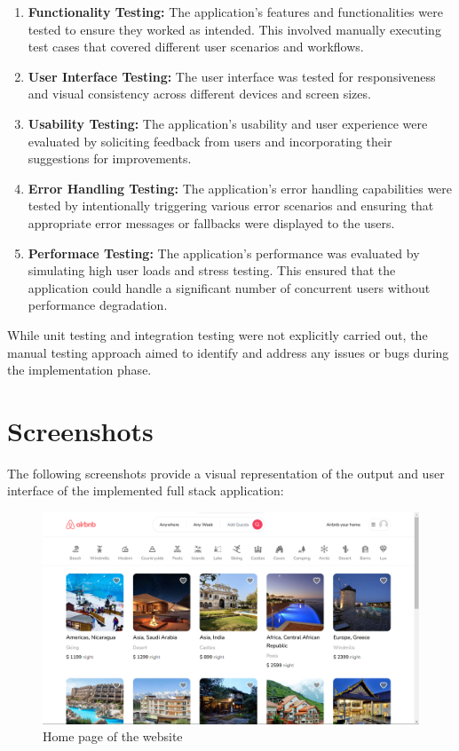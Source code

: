 \begin{enumerate}
	\item \textbf{Functionality Testing: } The application's features and functionalities were tested to ensure they worked as intended. This involved manually executing test cases that covered different user scenarios and workflows.
	\item \textbf{User Interface Testing: } The user interface was tested for responsiveness and visual consistency across different devices and screen sizes.
	\item \textbf{Usability Testing: } The application's usability and user experience were evaluated by soliciting feedback from users and incorporating their suggestions for improvements.
	\item \textbf{Error Handling Testing: } The application's error handling capabilities were tested by intentionally triggering various error scenarios and ensuring that appropriate error messages or fallbacks were displayed to the users.
	\item \textbf{Performace Testing: } The application's performance was evaluated by simulating high user loads and stress testing. This ensured that the application could handle a significant number of concurrent users without performance degradation.
\end{enumerate}

While unit testing and integration testing were not explicitly carried out, the manual testing approach aimed to identify and address any issues or bugs during the implementation phase.

\section{Screenshots}
The following screenshots provide a visual representation of the output and user interface of the implemented full stack application:

\begin{figure}[!h]
	\centering
	\includegraphics[scale=0.3]{chapters/images/home-page.png}
	\caption{Home page of the website}
\end{figure}

